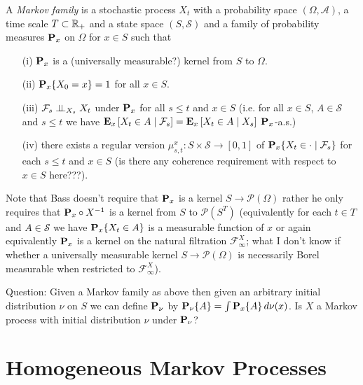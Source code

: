 \begin{defn}\label{MarkovFamilyDefn}
A \emph{Markov family} is a stochastic process $X_t$ with a
probability space $(\Omega, \mathcal{A})$, a time scale $T
\subset \reals_+$ and a state space $(S, \mathcal{S})$ and a family of
probability measures $\probabilityop_x$ on $\Omega$ for $x \in S$ such that 
\begin{itemize}
\item[(i)]$\probabilityop_x$ is a (universally measurable?) kernel
  from $S$ to $\Omega$.
\item[(ii)]$\sprobability{X_0 = x}{x} = 1$ for all $x \in S$.
\item[(iii)]$\cindependent{\mathcal{F}_s}{X_t}{X_s}$ under
  $\probabilityop_x$ for all $s \leq
  t$ and $x \in S$ (i.e. for all $x \in S$, $A \in \mathcal{S}$ and $s \leq t$ we have
  $\csexpectationlong{\mathcal{F}_s}{X_t \in A}{x} =
  \csexpectationlong{X_s}{X_t \in A}{x}$ $\probabilityop_x$-a.s.)
\item[(iv)]there exists a regular version $\mu^x_{s,t} :
  S \times \mathcal{S} \to [0,1]$ of $\csprobability{\mathcal{F}_s}{X_t
    \in \cdot}{x}$ for each $s \leq t$ and $x \in S$ (is there any coherence
  requirement with respect to $x \in S$ here???).
\end{itemize}
\end{defn}

Note that Bass doesn't require that $\probabilityop_x$ is a kernel $S
\to \mathcal{P}(\Omega)$ rather he only requires that
$\pushforward{X}{\probabilityop_x}$ is a kernel from $S$ to
$\mathcal{P}(S^T)$ (equivalently for each $t \in T$ and $A \in \mathcal{S}$ we have
$\sprobability{X_t \in A}{x}$ is a measurable function of $x$ or again
equivalently $\probabilityop_x$ is a kernel on the natural filtration
$\mathcal{F}^X_\infty$; what I don't know if whether a universally
measurable kernel $S \to  \mathcal{P}(\Omega)$ is necessarily Borel
measurable when restricted to $\mathcal{F}^X_\infty$).

Question:  Given a Markov family as above then given an arbitrary
initial distribution $\nu$ on $S$ we can define $\probabilityop_\nu$
by $\sprobability{A}{\nu} = \int \sprobability{A}{x} \, d\nu(x)$.  Is
$X$ a Markov process with initial distribution $\nu$ under
$\probabilityop_\nu$?

\section{Homogeneous Markov Processes}

